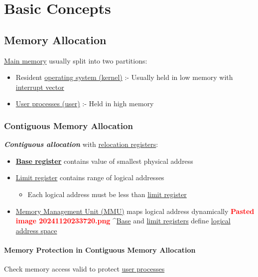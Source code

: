 \section*{Basic Concepts}

\subsection*{Memory Allocation}

\ul{Main memory} usually split into two partitions:

\begin{itemize}
\tightlist
\item
  Resident \ul{operating system (kernel)} :- Usually held in low memory
  with \ul{interrupt vector}
\item
  \ul{User processes (user)} :- Held in high memory
\end{itemize}

\subsubsection*{Contiguous Memory Allocation}

\textbf{\textit{Contiguous allocation}} with \ul{relocation registers}:

\begin{itemize}
\tightlist
\item
  \textbf{\ul{Base register}} contains value of smallest physical
  address
\item
  \ul{Limit register} contains range of logical addresses

  \begin{itemize}
  \tightlist
  \item
    Each logical address must be less than \ul{limit register}
  \end{itemize}
\item
  \ul{Memory Management Unit (MMU)} maps logical address dynamically
  \textcolor{red}{\textbf{Pasted image 20241120233720.png}}
  \^{}\ul{Base} and \ul{limit registers} define \ul{logical address
  space}
\end{itemize}

\paragraph*{Memory Protection in Contiguous Memory Allocation}

Check memory access valid to protect \ul{user processes}

